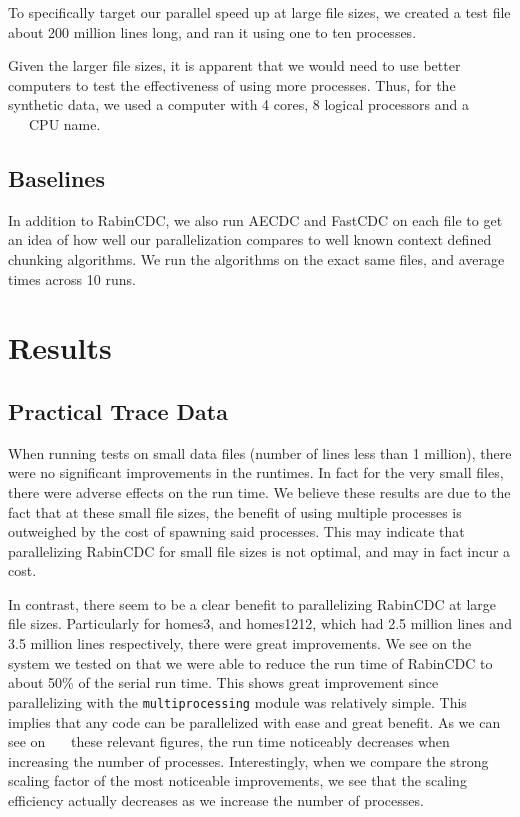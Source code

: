 \documentclass{acmtog} %
\begin{document}
	To specifically target our parallel speed up at large file sizes, we created a test file about 200 million lines long, and ran it using one to ten processes. 
	
	Given the larger file sizes, it is apparent that we would need to use better computers to test the effectiveness of using more processes. Thus, for the synthetic data, we used a computer with 4 cores, 8 logical processors and a ~~~CPU name. 
	
	\subsection{Baselines}
	In addition to RabinCDC, we also run AECDC and FastCDC on each file to get an idea of how well our parallelization compares to well known context defined chunking algorithms. We run the algorithms on the exact same files, and average times across 10 runs.  
	
	\section{Results}
	\subsection{Practical Trace Data}
	When running tests on small data files (number of lines less than 1 million), there were no significant improvements in the runtimes. In fact for the very small files, there were adverse effects on the run time. We believe these results are due to the fact that at these small file sizes, the benefit of using multiple processes is outweighed by the cost of spawning said processes. This may indicate that parallelizing RabinCDC for small file sizes is not optimal, and may in fact incur a cost.
	
	In contrast, there seem to be a clear benefit to parallelizing RabinCDC at large file sizes. Particularly for homes3, and homes1212, which had 2.5 million lines and 3.5 million lines respectively, there were great improvements. We see on the system we tested on that we were able to reduce the run time of RabinCDC to about 50\% of the serial run time. This shows great improvement since parallelizing with the \texttt{multiprocessing} module was relatively simple. This implies that any code can be parallelized with ease and great benefit. As we can see on ~~~these relevant figures, the run time noticeably decreases when increasing the number of processes. Interestingly, when we compare the strong scaling factor of the most noticeable improvements, we see that the scaling efficiency actually decreases as we increase the number of processes.
		
\end{document}
